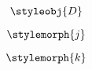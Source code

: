 {\begin{forslides}
        \begin{equation}
            \label{eq:50}
            \styleobj{D}
        \end{equation}

        \begin{equation}
            \label{eq:51}
            \stylemorph{j}
        \end{equation}

        \begin{equation}
            \label{eq:52}
            \stylemorph{k}
        \end{equation}

    \end{forslides}
}

